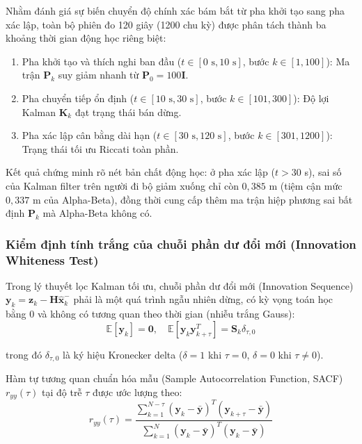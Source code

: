 \hspace{0.5cm} Nhằm đánh giá sự biến chuyển độ chính xác bám bắt từ pha khởi tạo sang pha xác lập, toàn bộ phiên đo 120 giây (1200 chu kỳ) được phân tách thành ba khoảng thời gian động học riêng biệt:
\begin{enumerate}
    \item Pha khởi tạo và thích nghi ban đầu ($t \in [0\text{ s}, 10\text{ s}]$, bước $k \in [1, 100]$): Ma trận $\mathbf{P}_k$ suy giảm nhanh từ $\mathbf{P}_0 = 100\mathbf{I}$.
    \item Pha chuyển tiếp ổn định ($t \in [10\text{ s}, 30\text{ s}]$, bước $k \in [101, 300]$): Độ lợi Kalman $\mathbf{K}_k$ đạt trạng thái bán dừng.
    \item Pha xác lập cân bằng dài hạn ($t \in [30\text{ s}, 120\text{ s}]$, bước $k \in [301, 1200]$): Trạng thái tối ưu Riccati toàn phần.
\end{enumerate}

Kết quả chứng minh rõ nét bản chất động học: ở pha xác lập ($t > 30$ s), sai số của Kalman filter trên người đi bộ giảm xuống chỉ còn $0{,}385$ m (tiệm cận mức $0{,}337$ m của Alpha-Beta), đồng thời cung cấp thêm ma trận hiệp phương sai bất định $\mathbf{P}_k$ mà Alpha-Beta không có.

\subsubsection{Kiểm định tính trắng của chuỗi phần dư đổi mới (Innovation Whiteness Test)}

\hspace{0.5cm} Trong lý thuyết lọc Kalman tối ưu, chuỗi phần dư đổi mới (Innovation Sequence) $\mathbf{y}_k = \mathbf{z}_k - \mathbf{H} \hat{\mathbf{x}}_k^-$ phải là một quá trình ngẫu nhiên dừng, có kỳ vọng toán học bằng 0 và không có tương quan theo thời gian (nhiễu trắng Gauss):
\begin{equation}
\mathbb{E}[\mathbf{y}_k] = \mathbf{0}, \quad \mathbb{E}[\mathbf{y}_k \mathbf{y}_{k+\tau}^T] = \mathbf{S}_k \delta_{\tau, 0}
\label{eq:innovation-whiteness}
\end{equation}

trong đó $\delta_{\tau, 0}$ là ký hiệu Kronecker delta ($\delta = 1$ khi $\tau = 0$, $\delta = 0$ khi $\tau \ne 0$).

Hàm tự tương quan chuẩn hóa mẫu (Sample Autocorrelation Function, SACF) $r_{yy}(\tau)$ tại độ trễ $\tau$ được ước lượng theo:
\begin{equation}
r_{yy}(\tau) = \frac{\sum_{k=1}^{N-\tau} (\mathbf{y}_k - \bar{\mathbf{y}})^T (\mathbf{y}_{k+\tau} - \bar{\mathbf{y}})}{\sum_{k=1}^{N} (\mathbf{y}_k - \bar{\mathbf{y}})^T (\mathbf{y}_k - \bar{\mathbf{y}})}
\label{eq:sacf-formula}
\end{equation}

